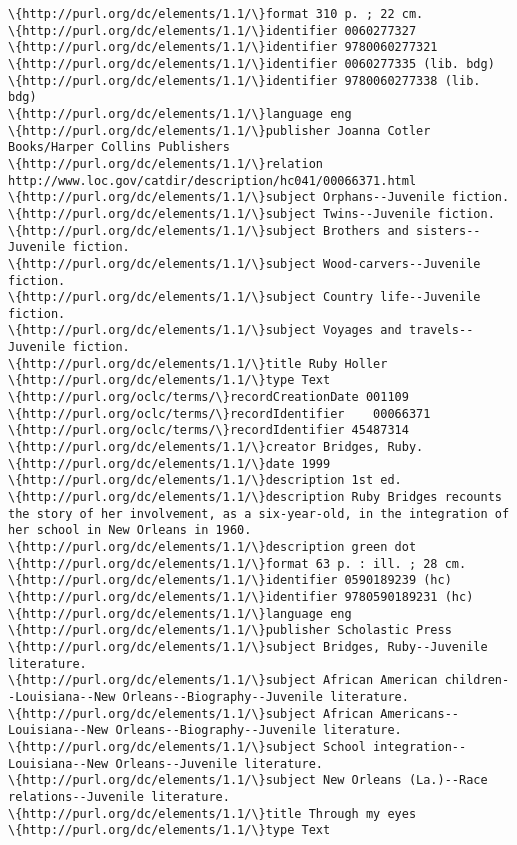 \documentclass[11pt]{article}
\begin{document}
\begin{Verbatim}[commandchars=\\\{\}]
\{http://purl.org/dc/elements/1.1/\}format 310 p. ; 22 cm.
\{http://purl.org/dc/elements/1.1/\}identifier 0060277327
\{http://purl.org/dc/elements/1.1/\}identifier 9780060277321
\{http://purl.org/dc/elements/1.1/\}identifier 0060277335 (lib. bdg)
\{http://purl.org/dc/elements/1.1/\}identifier 9780060277338 (lib. bdg)
\{http://purl.org/dc/elements/1.1/\}language eng
\{http://purl.org/dc/elements/1.1/\}publisher Joanna Cotler Books/Harper Collins Publishers
\{http://purl.org/dc/elements/1.1/\}relation http://www.loc.gov/catdir/description/hc041/00066371.html
\{http://purl.org/dc/elements/1.1/\}subject Orphans--Juvenile fiction.
\{http://purl.org/dc/elements/1.1/\}subject Twins--Juvenile fiction.
\{http://purl.org/dc/elements/1.1/\}subject Brothers and sisters--Juvenile fiction.
\{http://purl.org/dc/elements/1.1/\}subject Wood-carvers--Juvenile fiction.
\{http://purl.org/dc/elements/1.1/\}subject Country life--Juvenile fiction.
\{http://purl.org/dc/elements/1.1/\}subject Voyages and travels--Juvenile fiction.
\{http://purl.org/dc/elements/1.1/\}title Ruby Holler 
\{http://purl.org/dc/elements/1.1/\}type Text
\{http://purl.org/oclc/terms/\}recordCreationDate 001109
\{http://purl.org/oclc/terms/\}recordIdentifier    00066371 
\{http://purl.org/oclc/terms/\}recordIdentifier 45487314
\{http://purl.org/dc/elements/1.1/\}creator Bridges, Ruby.
\{http://purl.org/dc/elements/1.1/\}date 1999
\{http://purl.org/dc/elements/1.1/\}description 1st ed.
\{http://purl.org/dc/elements/1.1/\}description Ruby Bridges recounts the story of her involvement, as a six-year-old, in the integration of her school in New Orleans in 1960.
\{http://purl.org/dc/elements/1.1/\}description green dot
\{http://purl.org/dc/elements/1.1/\}format 63 p. : ill. ; 28 cm.
\{http://purl.org/dc/elements/1.1/\}identifier 0590189239 (hc)
\{http://purl.org/dc/elements/1.1/\}identifier 9780590189231 (hc)
\{http://purl.org/dc/elements/1.1/\}language eng
\{http://purl.org/dc/elements/1.1/\}publisher Scholastic Press
\{http://purl.org/dc/elements/1.1/\}subject Bridges, Ruby--Juvenile literature.
\{http://purl.org/dc/elements/1.1/\}subject African American children--Louisiana--New Orleans--Biography--Juvenile literature.
\{http://purl.org/dc/elements/1.1/\}subject African Americans--Louisiana--New Orleans--Biography--Juvenile literature.
\{http://purl.org/dc/elements/1.1/\}subject School integration--Louisiana--New Orleans--Juvenile literature.
\{http://purl.org/dc/elements/1.1/\}subject New Orleans (La.)--Race relations--Juvenile literature.
\{http://purl.org/dc/elements/1.1/\}title Through my eyes 
\{http://purl.org/dc/elements/1.1/\}type Text

\end{Verbatim}
\end{document}
